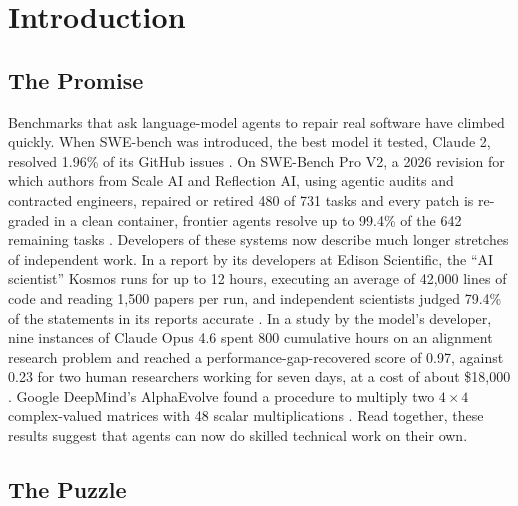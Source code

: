 \section{Introduction}\label{sec:intro}

\subsection{The Promise}

Benchmarks that ask language-model agents to repair real software have climbed quickly. When SWE-bench was introduced, the best model it tested, Claude 2, resolved 1.96\% of its GitHub issues \citep{C1}. On SWE-Bench Pro V2, a 2026 revision for which authors from Scale AI and Reflection AI, using agentic audits and contracted engineers, repaired or retired 480 of 731 tasks and every patch is re-graded in a clean container, frontier agents resolve up to 99.4\% of the 642 remaining tasks \citep{C12}. Developers of these systems now describe much longer stretches of independent work. In a report by its developers at Edison Scientific, the ``AI scientist'' Kosmos runs for up to 12 hours, executing an average of 42,000 lines of code and reading 1,500 papers per run, and independent scientists judged 79.4\% of the statements in its reports accurate \citep{S13}. In a study by the model's developer, nine instances of Claude Opus 4.6 spent 800 cumulative hours on an alignment research problem and reached a performance-gap-recovered score of 0.97, against 0.23 for two human researchers working for seven days, at a cost of about \$18,000 \citep{S20}. Google DeepMind's AlphaEvolve found a procedure to multiply two $4 \times 4$ complex-valued matrices with 48 scalar multiplications \citep{A25}. Read together, these results suggest that agents can now do skilled technical work on their own.

\subsection{The Puzzle}

